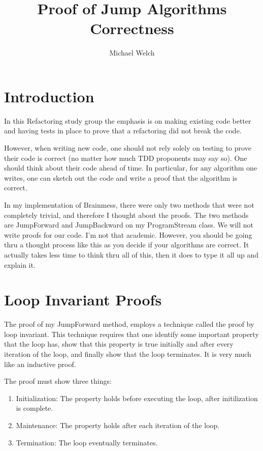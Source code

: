 \documentclass[10pt]{amsart}
\begin{document}
\title{Proof of Jump Algorithms Correctness}
\author{Michael Welch}
\maketitle

\section*{Introduction}
In this Refactoring study group the emphasis is on making existing code
better and having tests in place to prove that a refactoring did not
break the code.

However, when writing new code, one should not rely solely on testing
to prove their code is correct (no matter how much TDD proponents may say
so). One should think about their code ahead of time. In particular,
for any algorithm one writes, one can sketch out
the code and write a proof that the algorithm is correct.

In my implementation of Brainmess, there were only two methods that
were not completely trivial, and therefore I thought about the proofs.
The two methods are JumpForward and JumpBackward on my ProgramStream
class. We will not write proofs for our code. I'm not that academic.
However, you should be going thru a thought process like this as you decide
if your algorithms are correct. It actually takes less time to think 
thru all of this, then it does to type it all up and explain it.

\section*{Loop Invariant Proofs}
The proof of my JumpForward method, employs a technique called the
proof by loop invariant. This technique requires that one
identify some important property that the loop has, show that this
property is true initially and after every iteration of the loop,
and finally show that the loop terminates. It is very
much like an inductive proof.

The proof must show three things:

\begin{enumerate}
\item Initialization: The property holds before executing the loop, after initilization is complete.

\item Maintenance: The property holds after each iteration of the loop.

\item Termination: The loop eventually terminates.
\end{enumerate}
\end{document}
